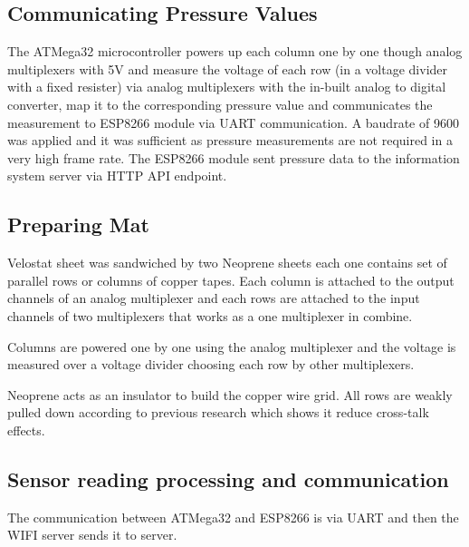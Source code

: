 \subsection{Communicating Pressure Values} 

The ATMega32 microcontroller powers up each column one by one though analog multiplexers with 5V and measure the voltage of each row (in a voltage divider with a fixed resister) via analog multiplexers with the in-built analog to digital converter, map it to the corresponding pressure value and communicates the measurement to ESP8266 module via UART communication. A baudrate of 9600 was applied and it was sufficient as pressure measurements are not required in a very high frame rate. The ESP8266 module sent pressure data to the information system server via HTTP API endpoint.


\subsection{Preparing Mat}

Velostat sheet was sandwiched by two Neoprene sheets each one contains set of parallel rows or columns of copper tapes. Each column is attached to the output channels of an analog multiplexer and each rows are attached to the input channels of two multiplexers that works as a one multiplexer in combine. 



Columns are powered one by one using the analog multiplexer and the voltage is measured over a voltage divider choosing each row by other multiplexers. 

Neoprene acts as an insulator to build the copper wire grid. All rows are weakly pulled down according to previous research which shows it reduce cross-talk effects.

\subsection{Sensor reading processing and communication}
The communication between ATMega32 and ESP8266 is via UART and then the WIFI server sends it to server. 






